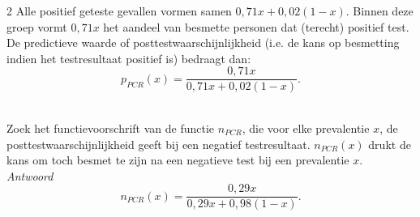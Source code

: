 \begin{multicols}{2}
Alle positief geteste gevallen vormen samen $0,71x+0,02(1-x)$. Binnen deze groep vormt $0,71x$ het aandeel van besmette personen dat (terecht) positief test. De predictieve waarde of posttestwaarschijnlijkheid (i.e. de kans op besmetting indien het testresultaat positief is) bedraagt dan:
$$p_{PCR}(x) = \frac{0,71x}{0,71x+0,02(1-x)}.$$
\end{multicols}
\\
Zoek het functievoorschrift van de functie $n_{PCR}$, die voor elke prevalentie $x$, de posttestwaarschijnlijkheid geeft bij een negatief testresultaat. $n_{PCR}(x)$ drukt de kans om toch besmet te zijn na een negatieve test bij een prevalentie $x$.\\

\noindent \textit{Antwoord}\\
$$n_{PCR}(x) = \frac{0,29x}{0,29x + 0,98(1-x)}.$$
\eindewerktekst






